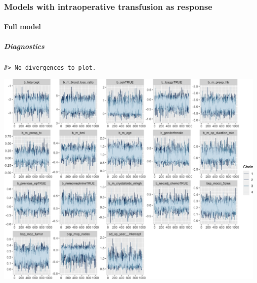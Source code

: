 \documentclass[
]{article}
\begin{document}
\hypertarget{models-with-intraoperative-transfusion-as-response}{%
\subsubsection{Models with intraoperative transfusion as response}\label{models-with-intraoperative-transfusion-as-response}}

\hypertarget{full-model}{%
\paragraph{Full model}\label{full-model}}

\hypertarget{diagnostics}{%
\subparagraph{Diagnostics}\label{diagnostics}}

\begin{verbatim}
#> No divergences to plot.
\end{verbatim}

\begin{center}\includegraphics[width=1\linewidth]{notebook_files/figure-latex/model1full_diagnostics-1} \end{center}
\end{document}
